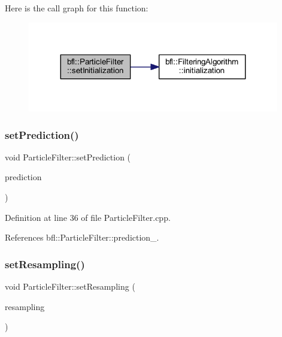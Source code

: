 Here is the call graph for this function\+:
\nopagebreak
\begin{figure}[H]
\begin{center}
\leavevmode
\includegraphics[width=311pt]{classbfl_1_1ParticleFilter_abfeb75fd575802f362039c26169eed8b_cgraph}
\end{center}
\end{figure}
\mbox{\label{classbfl_1_1ParticleFilter_a213811368143c1f498c87be70cf02379}} 
\subsubsection{\texorpdfstring{set\+Prediction()}{setPrediction()}}
{\footnotesize\ttfamily void Particle\+Filter\+::set\+Prediction (\begin{DoxyParamCaption}\item[{std\+::unique\+\_\+ptr$<$ \mbox{\hyperlink{classbfl_1_1PFPrediction}{P\+F\+Prediction}} $>$}]{prediction }\end{DoxyParamCaption})\hspace{0.3cm}{\ttfamily [inherited]}}



Definition at line 36 of file Particle\+Filter.\+cpp.



References bfl\+::\+Particle\+Filter\+::prediction\+\_\+.

\mbox{\label{classbfl_1_1ParticleFilter_ad1618ed06b6e6e143e309e2267b970ee}} 
\subsubsection{\texorpdfstring{set\+Resampling()}{setResampling()}}
{\footnotesize\ttfamily void Particle\+Filter\+::set\+Resampling (\begin{DoxyParamCaption}\item[{std\+::unique\+\_\+ptr$<$ \mbox{\hyperlink{classbfl_1_1Resampling}{Resampling}} $>$}]{resampling }\end{DoxyParamCaption})\hspace{0.3cm}{\ttfamily [inherited]}}



